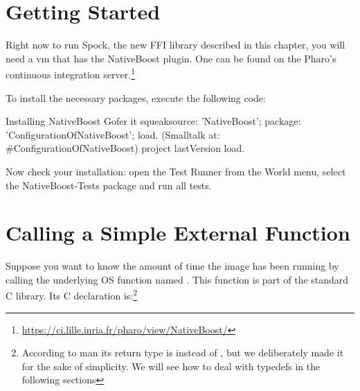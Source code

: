 \documentclass[a4paper,10pt,twoside]{book}
\begin{document}
\section{Getting Started}



Right now to run Spock, the new FFI library described in this chapter,
you will need a vm that has the NativeBoost plugin. One can be found
on the Pharo's continuous integration
server.\footnote{\url{https://ci.lille.inria.fr/pharo/view/NativeBoost/}}

To install the necessary packages, execute the following code:

\begin{script}{Installing NativeBoost}
Gofer it
    squeaksource: 'NativeBoost';
    package: 'ConfigurationOfNativeBoost';
    load.
(Smalltalk at: #ConfigurationOfNativeBoost) project lastVersion load.
\end{script}

Now check your installation: open the Test Runner from the World menu,
select the NativeBoost-Tests package and run all tests.

%
%
%
%
%
%
%
% 
%


\section{Calling a Simple External Function}


Suppose you want to know the amount of time the image has been running
by calling the underlying OS function named . This function
is part of the standard C library. Its C declaration
is:\footnote{According to man its return type is  instead
  of , but we deliberately made it  for the sake of
  simplicity. We will see how to deal with typedefs in the following
  sections}
\end{document}
